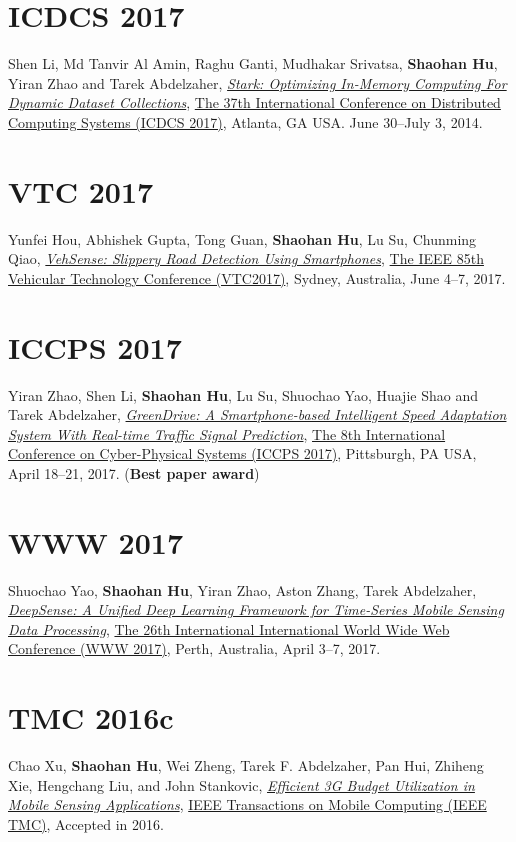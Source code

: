 \section{\sc ICDCS 2017}\hypertarget{li2017icdcs}{}
Shen Li, Md Tanvir Al Amin, Raghu Ganti, Mudhakar Srivatsa, \textbf{Shaohan Hu}, Yiran Zhao and Tarek Abdelzaher,
\href{}{\emph{Stark: Optimizing In-Memory Computing For Dynamic Dataset Collections}},
\href{http://icdcs2017.gatech.edu/}{\textsf{The 37th International Conference on Distributed Computing Systems (ICDCS 2017)}},
Atlanta, GA USA. June 30--July 3, 2014.

\section{\sc VTC 2017}\hypertarget{hou2017vtc}{}
Yunfei Hou, Abhishek Gupta, Tong Guan, \textbf{Shaohan Hu}, Lu Su, Chunming Qiao,
\href{}{\emph{VehSense: Slippery Road Detection Using Smartphones}},
\href{http://ieeevtc.org/vtc2017spring}{\textsf{The IEEE 85th Vehicular Technology Conference (VTC2017)}},
Sydney, Australia, June 4--7, 2017.

\section{\sc ICCPS 2017}\hypertarget{zhao2017iccps}{}
Yiran Zhao, Shen Li, \textbf{Shaohan Hu}, Lu Su, Shuochao Yao, Huajie Shao and Tarek Abdelzaher,
\href{}{\emph{GreenDrive: A Smartphone-based Intelligent Speed Adaptation System With Real-time Traffic Signal Prediction}},
\href{http://iccps2017.cse.wustl.edu}{\textsf{The 8th International Conference on Cyber-Physical Systems (ICCPS 2017)}},
Pittsburgh, PA USA, April 18--21, 2017. (\textbf{Best paper award})

\section{\sc WWW 2017}\hypertarget{yao2017www}{}
Shuochao Yao, \textbf{Shaohan Hu}, Yiran Zhao, Aston Zhang, Tarek Abdelzaher,
\href{http://dl.acm.org/citation.cfm?id=3052577}{\emph{DeepSense: A Unified Deep Learning Framework for Time-Series Mobile Sensing Data Processing}},
\href{http://www.www2017.com.au/}{\textsf{The 26th International International World Wide Web Conference (WWW 2017)}},
Perth, Australia, April 3--7, 2017.

\section{\sc TMC 2016c}\hypertarget{xu2016tmc}{}
Chao Xu, \textbf{Shaohan Hu}, Wei Zheng, Tarek F. Abdelzaher, Pan Hui, Zhiheng Xie, Hengchang Liu, and John Stankovic,
\href{}{\emph{Efficient 3G Budget Utilization in Mobile Sensing Applications}},
\href{http://www.computer.org/web/tmc}{\textsf{IEEE Transactions on Mobile Computing (IEEE TMC)}},
Accepted in 2016.

